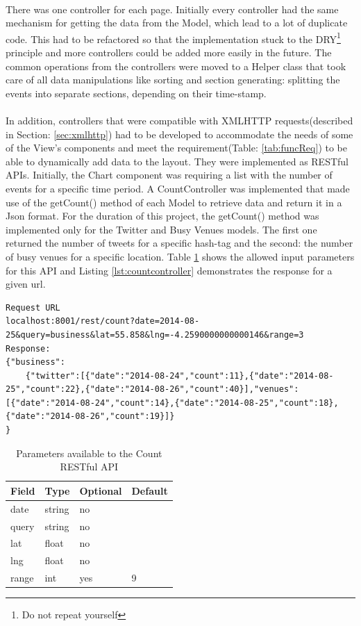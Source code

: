 \documentclass{l4proj}
\begin{document}
\paragraph{}
There was one controller for each page. Initially every controller had the same mechanism for getting the data from the Model, which lead to a lot of duplicate code. This had to be refactored so that the implementation stuck to the DRY\footnote{Do not repeat yourself} principle and more controllers could be added more easily in the future. The common operations from the controllers were moved to a Helper class that took care of all data manipulations like sorting and section generating: splitting the events into separate sections, depending on their time-stamp.

\paragraph{} 
In addition, controllers that were compatible with XMLHTTP requests(described in Section: \ref{sec:xmlhttp}) had to be developed to accommodate the needs of some of the View's components and meet the requirement(Table: \ref{tab:funcReq}) to be able to dynamically add data to the layout. They were implemented as RESTful APIs. Initially, the Chart component was requiring a list with the number of events for a specific time period. A CountController was implemented that made use of the getCount() method of each Model to retrieve data and return it in a Json format. For the duration of this project, the getCount() method was implemented only for the Twitter and Busy Venues models. The first one returned the number of tweets for a specific hash-tag and the second: the number of busy venues for a specific location. Table \ref{tab:countapi} shows the allowed input parameters for this API and Listing \ref{lst:countcontroller} demonstrates the response for a given url. 

\begin{lstlisting}[caption={Count API Request and Response},label={lst:countcontroller}]
Request URL
localhost:8001/rest/count?date=2014-08-25&query=business&lat=55.858&lng=-4.2590000000000146&range=3
Response:
{"business":
	{"twitter":[{"date":"2014-08-24","count":11},{"date":"2014-08-25","count":22},{"date":"2014-08-26","count":40}],"venues":[{"date":"2014-08-24","count":14},{"date":"2014-08-25","count":18},{"date":"2014-08-26","count":19}]}
}
\end{lstlisting}

\begin{table}[H]
	\centering
	\begin{tabular}{|l|l|l|l|} \hline
		Field	&	Type	& Optional & Default\\ \hline
		date 	& string & no  & \\ \hline
		query 	& string & no  & \\ \hline
		lat 	& float & no  & \\ \hline
		lng 	& float & no  & \\ \hline
		range 	& int & yes  & 9\\ \hline
	\end{tabular}
	\caption{Parameters available to the Count RESTful API}
	\label{tab:countapi}
\end{table}
\end{document}
